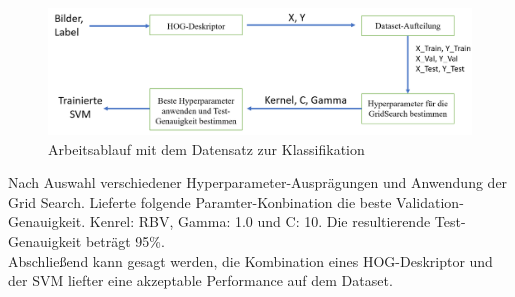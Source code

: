 \begin{figure}[h]
\centering
\includegraphics[scale=0.45]{./bilder/workflow.png}
\caption{Arbeitsablauf mit dem Datensatz zur Klassifikation}
\end{figure}

Nach Auswahl verschiedener Hyperparameter-Ausprägungen und Anwendung der Grid Search. Lieferte folgende Paramter-Konbination die beste Validation-Genauigkeit.
Kenrel: RBV, Gamma: 1.0 und C: 10.
Die resultierende Test-Genauigkeit beträgt 95\%.\\
Abschließend kann gesagt werden, die Kombination eines HOG-Deskriptor und der SVM liefter eine akzeptable Performance auf dem Dataset.
